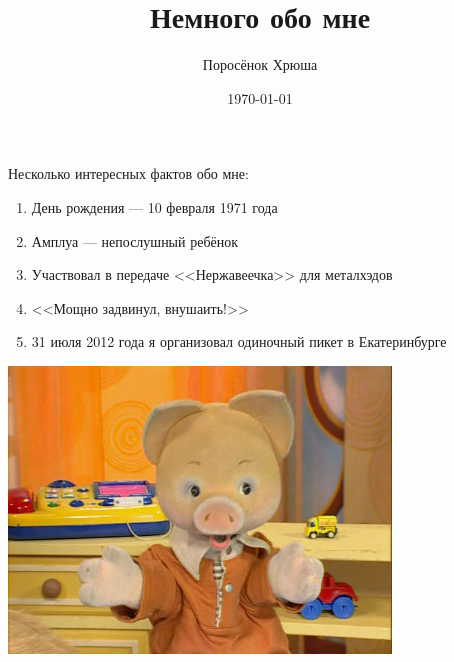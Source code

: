 \documentclass[pdftex,12pt,a4paper]{article}
\title{Немного обо мне}
\author{Поросёнок Хрюша}
\date{\today}
\begin{document}
\maketitle %

Несколько интересных фактов обо мне:

\begin{enumerate}
\item День рождения --- 10 февраля 1971 года
\item Амплуа --- непослушный ребёнок
\item Участвовал в передаче <<Нержавеечка>> для металхэдов
\item <<Мощно задвинул, внушаить!>>
\item 31 июля 2012 года я организовал одиночный пикет в Екатеринбурге
\end{enumerate}


\includegraphics[height=3in]{khrusha.jpg}
\end{document}
